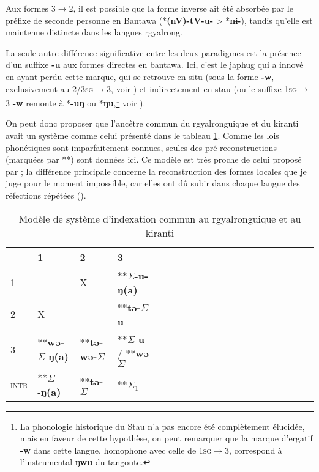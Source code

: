 \documentclass[oldfontcommands,oneside,a4paper,11pt]{article}
\newcommand{\ipa}[1]{{\phon\textbf{\mbox{#1}}}} %
\newcommand{\grise}[1]{\cellcolor{lightgray}\textbf{#1}}
\newcommand{\ra}{$\Sigma_1$}
\newcommand{\ro}{$\Sigma$}
\begin{document}
Aux formes \textsc{3$\rightarrow$2}, il est possible que la forme inverse ait été absorbée par le préfixe de seconde personne en Bantawa (*\ipa{(nV)-tV-u-}  > *\ipa{nɨ-}), tandis qu'elle est maintenue distincte dans les langues rgyalrong. 

La seule autre différence significative entre les deux paradigmes est la présence d'un suffixe \ipa{-u} aux formes directes en bantawa. Ici, c'est le japhug qui a innové en ayant perdu cette marque, qui se retrouve en situ (sous la forme \ipa{-w}, exclusivement au \textsc{2/3sg$\rightarrow$3}, voir \citealt{linyj03tense}) et indirectement en stau (ou le suffixe \textsc{1sg$\rightarrow$3} \ipa{-w} remonte à *\ipa{-uŋ} ou *\ipa{ŋu},\footnote{La phonologie historique du Stau n'a pas encore été complètement élucidée, mais en faveur de cette hypothèse, on peut remarquer que la marque d'ergatif \ipa{-w} dans cette langue, homophone avec celle de \textsc{1sg$\rightarrow$3}, correspond à l'instrumental \ipa{ŋwu} du tangoute. } voir \citealt{jacques14rtau}).

On peut donc proposer que l'ancêtre commun du rgyalronguique et du kiranti avait un système comme celui présenté dans le tableau \ref{tab:commun}. Comme les lois phonétiques sont imparfaitement connues, seules des pré-reconstructions (marquées par **) sont données ici. Ce modèle est très proche de celui proposé par \citet{delancey14second}; la différence principale concerne la reconstruction des formes locales que je juge pour le moment impossible, car elles ont dû subir dans chaque langue des réfections répétées (\citealt{heath98skewing}).  

 

\begin{table}[H]
\caption{Modèle de système d'indexation commun au rgyalronguique et au kiranti} \centering \label{tab:commun}
\begin{tabular}{l|lllllllllllllllllll}
\toprule
&1 & 2 &3 &\\
\midrule
1 &\grise{}& X& **\ro{}-\ipa{u-ŋ(a)}	 \\
2 &X &\grise{} & **\ipa{tə-}\ro{}-\ipa{u}\\
3 &**\ipa{wə-}\ro{}-\ipa{ŋ(a)}&**\ipa{tə-wə-}\ro{}& **\ro{}-\ipa{u} / **\ipa{wə}-\ro{} \\
\midrule
\textsc{intr} & **\ro{}-\ipa{ŋ(a)}&**\ipa{tə-}\ro{}&**\ra{} \\
\bottomrule
\end{tabular}
\end{table}
 
\end{document}
